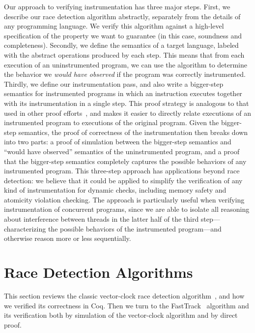 \documentclass[preprint, 10pt]{sigplanconf}
\begin{document}
Our approach to verifying instrumentation has three major steps. First, we describe our race detection algorithm abstractly, separately from the details of any programming language. We verify this algorithm against a high-level specification of the property we want to guarantee (in this case, soundness and completeness). Secondly, we define the semantics of a target language, labeled with the abstract operations produced by each step. This means that from each execution of an uninstrumented program, we can use the algorithm to determine the behavior we \emph{would have observed} if the program was correctly instrumented. Thirdly, we define our instrumentation pass, and also write a bigger-step semantics for instrumented programs in which an instruction executes together with its instrumentation in a single step. This proof strategy is analogous to that used in other proof efforts~\cite{softbound}, and makes it easier to directly relate executions of an instrumented program to executions of the original program. Given the bigger-step semantics, the proof of correctness of the instrumentation then breaks down into two parts: a proof of simulation between the bigger-step semantics and ``would have observed'' semantics of the uninstrumented program, and a proof that the bigger-step semantics completely captures the possible behaviors of any instrumented program. This three-step approach has applications beyond race detection: we believe that it could be applied to simplify the verification of any kind of instrumentation for dynamic checks, including memory safety and atomicity violation checking. The approach is particularly useful when verifying instrumentation of concurrent programs, since we are able to isolate all reasoning about interference between threads in the latter half of the third step---characterizing the possible behaviors of the instrumented program---and otherwise reason more or less sequentially.

\section{Race Detection Algorithms}
\label{algorithms}
This section reviews the classic vector-clock race detection algorithm~\cite{vcmattern, vcfidge}, and how we verified its correctness in Coq. Then we turn to the FastTrack~\cite{fasttrack} algorithm and its verification both by simulation of the vector-clock algorithm and by direct proof.

\end{document}
